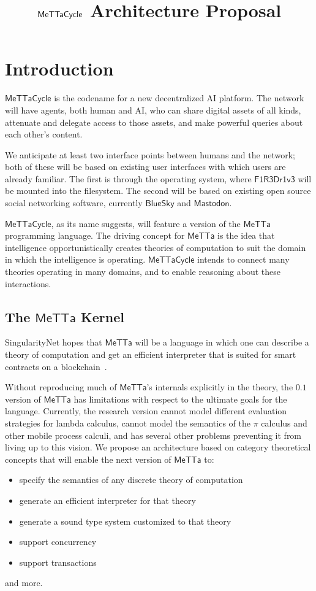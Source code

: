 \documentclass{article}
\title{$\MC$ Architecture Proposal}
\author{}
\date{}
\newcommand{\MC}{\mathsf{MeTTaCycle}}
\newcommand{\FD}{\mathsf{F1R3Dr1v3}}
\begin{document}
\maketitle

\tableofcontents

\section{Introduction}

$\MC$ is the codename for a new decentralized AI platform.  The network will have agents, both human and AI, who can share digital assets of all kinds, attenuate and delegate access to those assets, and make powerful queries about each other's content.  

We anticipate at least two interface points between humans and the network; both of these will be based on existing user interfaces with which users are already familiar.  The first is through the operating system, where $\FD$ will be mounted into the filesystem.  The second will be based on existing open source social networking software, currently $\mathsf{BlueSky}$ and $\mathsf{Mastodon}$.

$\MC$, as its name suggests, will feature a version of the $\mathsf{MeTTa}$ programming language.  The driving concept for $\mathsf{MeTTa}$ is the idea that intelligence opportunistically creates theories of computation to suit the domain in which the intelligence is operating.  $\MC$ intends to connect many theories operating in many domains, and to enable reasoning about these interactions.

\subsection{The $\mathsf{MeTTa}$ Kernel}

SingularityNet hopes that $\mathsf{MeTTa}$ will be a language in which
one can describe a theory of computation and get an efficient
interpreter that is suited for smart contracts on a
blockchain~\cite{GoertzelMeredith2024}.

Without reproducing much of $\mathsf{MeTTa}$'s internals explicitly in
the theory, the $0.1$ version of $\mathsf{MeTTa}$ has limitations with
respect to the ultimate goals for the language. Currently, the
research version cannot model different evaluation strategies for
lambda calculus, cannot model the semantics of the $\pi$ calculus and
other mobile process calculi, and has several other problems
preventing it from living up to this vision.  We propose an
architecture based on category theoretical concepts that will enable the next version of $\mathsf{MeTTa}$ to:
\begin{itemize}
    \item specify the semantics of any discrete theory of computation
    \item generate an efficient interpreter for that theory
    \item generate a sound type system customized to that theory
    \item support concurrency
    \item support transactions
\end{itemize}
and more.
\end{document}
